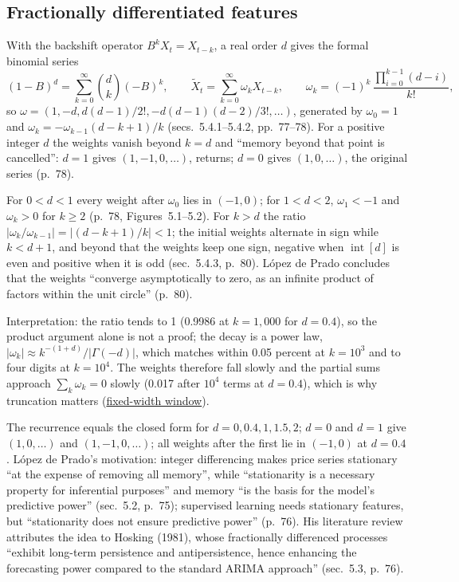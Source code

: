 \subsection{Fractionally differentiated features}

\begin{qfmodel}\label{mod:fractional-differencing-weights}
 With the backshift operator $B^kX_t=X_{t-k}$, a real order $d$ gives the formal binomial series \citep[chap.~5, sec.~5.4, p.~77]{alpha-afml}
\[ (1-B)^d=\sum_{k=0}^\infty\binom dk(-B)^k,\qquad \tilde X_t=\sum_{k=0}^\infty\omega_kX_{t-k},\qquad \omega_k=(-1)^k\,\frac{\prod_{i=0}^{k-1}(d-i)}{k!}, \]
so $\omega=(1,-d,d(d-1)/2!,-d(d-1)(d-2)/3!,\dots)$, generated by $\omega_0=1$ and $\omega_k=-\omega_{k-1}(d-k+1)/k$ (secs.~5.4.1--5.4.2, pp.~77--78). For a positive integer $d$ the weights vanish beyond $k=d$ and ``memory beyond that point is cancelled'': $d=1$ gives $(1,-1,0,\dots)$, returns; $d=0$ gives $(1,0,\dots)$, the original series (p.~78).

 For $0<d<1$ every weight after $\omega_0$ lies in $(-1,0)$; for $1<d<2$, $\omega_1<-1$ and $\omega_k>0$ for $k\ge2$ (p.~78, Figures~5.1--5.2). For $k>d$ the ratio $|\omega_k/\omega_{k-1}|=|(d-k+1)/k|<1$; the initial weights alternate in sign while $k<d+1$, and beyond that the weights keep one sign, negative when $\operatorname{int}[d]$ is even and positive when it is odd (sec.~5.4.3, p.~80). López de Prado concludes that the weights ``converge asymptotically to zero, as an infinite product of factors within the unit circle'' (p.~80).

Interpretation: the ratio tends to 1 (0.9986 at $k=1{,}000$ for $d=0.4$), so the product argument alone is not a proof; the decay is a power law, $|\omega_k|\approx k^{-(1+d)}/|\Gamma(-d)|$, which matches within 0.05 percent at $k=10^3$ and to four digits at $k=10^4$. The weights therefore fall slowly and the partial sums approach $\sum_k\omega_k=0$ slowly (0.017 after $10^4$ terms at $d=0.4$), which is why truncation matters (\hyperref[meth:fixed-width-fractional-differencing]{fixed-width window}).

 The recurrence equals the closed form for $d=0,0.4,1,1.5,2$; $d=0$ and $d=1$ give $(1,0,\dots)$ and $(1,-1,0,\dots)$; all weights after the first lie in $(-1,0)$ at $d=0.4$. López de Prado's motivation: integer differencing makes price series stationary ``at the expense of removing all memory'', while ``stationarity is a necessary property for inferential purposes'' and memory ``is the basis for the model's predictive power'' (sec.~5.2, p.~75); supervised learning needs stationary features, but ``stationarity does not ensure predictive power'' (p.~76). His literature review attributes the idea to Hosking (1981), whose fractionally differenced processes ``exhibit long-term persistence and antipersistence, hence enhancing the forecasting power compared to the standard ARIMA approach'' (sec.~5.3, p.~76).


\end{qfmodel}
